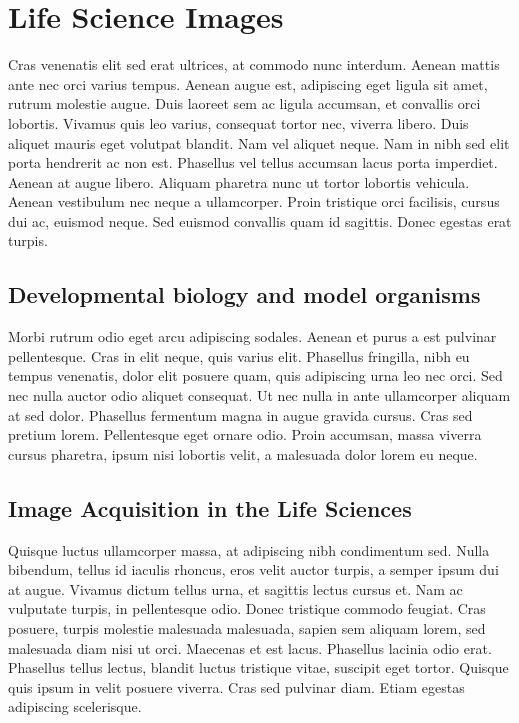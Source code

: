 \section{Life Science Images}

Cras venenatis elit sed erat ultrices, at commodo nunc
interdum. Aenean mattis ante nec orci varius tempus. Aenean augue est,
adipiscing eget ligula sit amet, rutrum molestie augue. Duis laoreet
sem ac ligula accumsan, et convallis orci lobortis. Vivamus quis leo
varius, consequat tortor nec, viverra libero. Duis aliquet mauris eget
volutpat blandit. Nam vel aliquet neque. Nam in nibh sed elit porta
hendrerit ac non est. Phasellus vel tellus accumsan lacus porta
imperdiet. Aenean at augue libero. Aliquam pharetra nunc ut tortor
lobortis vehicula. Aenean vestibulum nec neque a ullamcorper. Proin
tristique orci facilisis, cursus dui ac, euismod neque. Sed euismod
convallis quam id sagittis. Donec egestas erat turpis.


\subsection{Developmental biology and model organisms}

Morbi rutrum odio eget arcu adipiscing sodales. Aenean et purus a est
pulvinar pellentesque. Cras in elit neque, quis varius elit. Phasellus
fringilla, nibh eu tempus venenatis, dolor elit posuere quam, quis
adipiscing urna leo nec orci. Sed nec nulla auctor odio aliquet
consequat. Ut nec nulla in ante ullamcorper aliquam at sed
dolor. Phasellus fermentum magna in augue gravida cursus. Cras sed
pretium lorem. Pellentesque eget ornare odio. Proin accumsan, massa
viverra cursus pharetra, ipsum nisi lobortis velit, a malesuada dolor
lorem eu neque.


\subsection{Image Acquisition in the Life Sciences}

Quisque luctus ullamcorper massa, at adipiscing nibh condimentum
sed. Nulla bibendum, tellus id iaculis rhoncus, eros velit auctor
turpis, a semper ipsum dui at augue. Vivamus dictum tellus urna, et
sagittis lectus cursus et. Nam ac vulputate turpis, in pellentesque
odio. Donec tristique commodo feugiat. Cras posuere, turpis molestie
malesuada malesuada, sapien sem aliquam lorem, sed malesuada diam nisi
ut orci. Maecenas et est lacus. Phasellus lacinia odio erat. Phasellus
tellus lectus, blandit luctus tristique vitae, suscipit eget
tortor. Quisque quis ipsum in velit posuere viverra. Cras sed pulvinar
diam. Etiam egestas adipiscing scelerisque.

